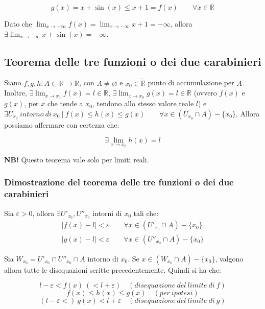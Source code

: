 \documentclass{article}
\begin{document}
\begin{equation*}
    g(x) = x + \sin(x) \leq x + 1 = f(x) \qquad \forall x \in \mathbb{R}
\end{equation*}

\noindent Dato che $\lim_{x \to - \infty} f(x) = \lim_{x \to - \infty} x + 1 = - \infty$, allora $\exists \lim_{x \to - \infty} x + \sin(x) = - \infty$.\\

\subsection{Teorema delle tre funzioni o dei due carabinieri}
Siano $f, g, h: A \subset \mathbb{R} \xrightarrow{} \mathbb{R}$, con $A \neq \varnothing$ e $x_0 \in \widetilde{\mathbb{R}}$ punto di accumulazione per $A$. Inoltre, $\exists \lim_{x \to x_0} f(x) = l \in \mathbb{R}$, $\exists \lim_{x \to x_0} g(x) = l \in \mathbb{R}$ (ovvero $f(x)$ e $g(x)$, per $x$ che tende a $x_0$, tendono allo stesso valore reale $l$) e $\exists U_{x_0} \ intorno \ di \ x_0 \ | \ f(x) \leq h(x) \leq g(x) \qquad \forall x \in (U_{x_0} \cap A) - \{x_0\}$. Allora possiamo affermare con certezza che:

\begin{equation*}
    \exists \lim_{x \to x_0} h(x) = l
\end{equation*}

\noindent\textbf{NB!} Questo teorema vale solo per limiti reali.

\subsubsection{Dimostrazione del teorema delle tre funzioni o dei due carabinieri}
Sia $\varepsilon > 0$, allora $\exists U'_{x_0}, U''_{x_0}$ intorni di $x_0$ tali che:
\begin{gather*}
    |f(x) - l| < \varepsilon \qquad \forall x \in (U'_{x_0} \cap A) - \{x_0\}\\
    |g(x) - l| < \varepsilon \qquad \forall x \in (U''_{x_0} \cap A) - \{x_0\}
\end{gather*}

\noindent Sia $W_{x_0} = U'_{x_0} \cap U''_{x_0} \cap A$ intorno di $x_0$. Se $x \in (W_{x_0} \cap A) - \{x_0\}$, valgono allora tutte le disequazioni scritte precedentemente. Quindi si ha che:

\begin{equation*}
    l - \varepsilon < f(x) \ (< l + \varepsilon) \quad (disequazione \ del \ limite \ di \ f)
\end{equation*}
\begin{equation*}
    f(x) \leq h(x) \leq g(x) \quad (per \ ipotesi)
\end{equation*}
\begin{equation*}
    (l - \varepsilon <) \ g(x) < l + \varepsilon \quad (disequazione \ del \ limite \ di \ g)
\end{equation*}
\end{document}
